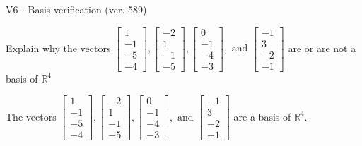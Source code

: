 \begin{exercise}
  \begin{exerciseTitle}V6 - Basis verification (ver. 589)\end{exerciseTitle}
  \begin{exerciseStatement}
    Explain why the vectors \(\left[\begin{array}{r}
1 \\
-1 \\
-5 \\
-4
\end{array}\right] , \left[\begin{array}{r}
-2 \\
1 \\
-1 \\
-5
\end{array}\right] , \left[\begin{array}{r}
0 \\
-1 \\
-4 \\
-3
\end{array}\right] , \text{ and } \left[\begin{array}{r}
-1 \\
3 \\
-2 \\
-1
\end{array}\right]\) are or are not a basis of \(\mathbb{R}^4\)	


  \end{exerciseStatement}
  \begin{exerciseAnswer}
   The vectors \(\left[\begin{array}{r}
1 \\
-1 \\
-5 \\
-4
\end{array}\right] , \left[\begin{array}{r}
-2 \\
1 \\
-1 \\
-5
\end{array}\right] , \left[\begin{array}{r}
0 \\
-1 \\
-4 \\
-3
\end{array}\right] , \text{ and } \left[\begin{array}{r}
-1 \\
3 \\
-2 \\
-1
\end{array}\right]\) 
  	 are  a basis of \(\mathbb{R}^4\).
  


  \end{exerciseAnswer}
\end{exercise}